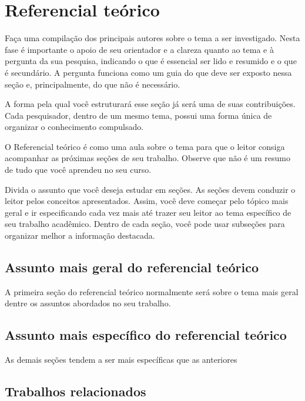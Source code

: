 \chapter{Referencial teórico}
\label{cap:referencial_teorico}

Faça uma compilação dos principais autores sobre o tema a ser investigado. Nesta fase é importante o apoio de seu orientador e a clareza quanto ao tema e à pergunta da sua pesquisa, indicando o que é essencial ser lido e resumido e o que é secundário. A pergunta funciona como um guia do que deve ser exposto nessa seção e, principalmente, do que não é necessário.

A forma pela qual você estruturará esse seção já será uma de suas contribuições. Cada pesquisador, dentro de um mesmo tema, possui uma forma única de organizar o conhecimento compulsado.

O Referencial teórico é como uma aula sobre o tema para que o leitor consiga acompanhar as próximas seções de seu trabalho. Observe que não é um resumo de tudo que você aprendeu no seu curso.

Divida o assunto que você deseja estudar em seções. As seções devem conduzir o leitor pelos conceitos apresentados. Assim, você deve começar pelo tópico mais geral e ir especificando cada vez mais até trazer seu leitor ao tema específico de seu trabalho acadêmico. Dentro de cada seção, você pode usar subseções para organizar melhor a informação destacada.

\section{Assunto mais geral do referencial teórico} \label{sub:assunto2}

A primeira seção do referencial teórico normalmente será sobre o tema mais geral dentre os assuntos abordados no seu trabalho. 

\section{Assunto mais específico do referencial teórico}

As demais seções tendem a ser mais específicas que as anteriores

\section{Trabalhos relacionados}

